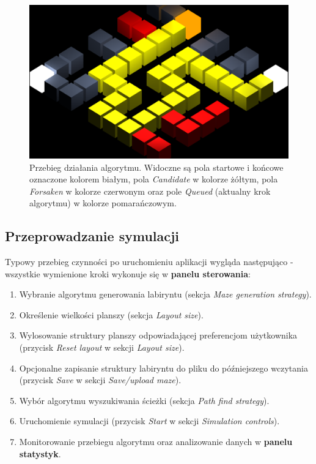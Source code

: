 \documentclass[../doc.tex]{subfiles}
\begin{document}
\begin{figure}[H]
  \centering
  \includegraphics[width=0.85\linewidth]{figures/colors.png}
  \caption{\centering Przebieg działania algorytmu. Widoczne są pola startowe i końcowe oznaczone kolorem białym, pola \textit{Candidate} w kolorze żółtym, pola \textit{Forsaken} w kolorze czerwonym oraz pole \textit{Queued} (aktualny krok algorytmu) w kolorze pomarańczowym.}
  \label{fig:colors}
\end{figure}

\subsection{Przeprowadzanie symulacji}

Typowy przebieg czynności po uruchomieniu aplikacji wygląda następująco - wszystkie wymienione kroki wykonuje się w \textbf{panelu sterowania}:

\begin{enumerate}

  \item Wybranie algorytmu generowania labiryntu (sekcja \textit{Maze generation strategy}).

  \item Określenie wielkości planszy (sekcja \textit{Layout size}).

  \item Wylosowanie struktury planszy odpowiadającej preferencjom użytkownika (przycisk \textit{Reset layout} w sekcji \textit{Layout size}).

  \item Opcjonalne zapisanie struktury labiryntu do pliku do późniejszego wczytania (przycisk \textit{Save} w sekcji \textit{Save/upload maze}).

  \item Wybór algorytmu wyszukiwania ścieżki (sekcja \textit{Path find strategy}).

  \item Uruchomienie symulacji (przycisk \textit{Start} w sekcji \textit{Simulation controls}).

  \item Monitorowanie przebiegu algorytmu oraz analizowanie danych w \textbf{panelu statystyk}.
\end{enumerate}
\end{document}
